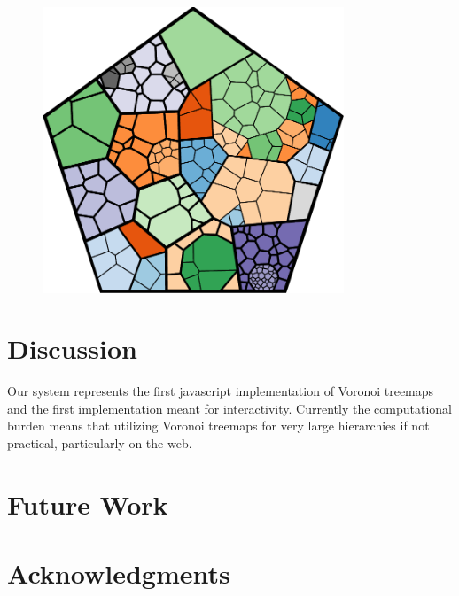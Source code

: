 \documentclass{acm_proc_article-sp} \usepackage{cite}
\begin{document}
\begin{figure}
\centering \includegraphics[width=90mm]{source-images/flare-color-pentagon-100.png}
\caption{}
\end{figure}


\section{Discussion}
\label{sec:discussion}
Our system represents the first javascript implementation of Voronoi
treemaps and the first implementation meant for
interactivity. Currently the computational burden means that utilizing
Voronoi treemaps for very large hierarchies if not practical,
particularly on the web.

\section{Future Work}
\label{sec:future}


\section{Acknowledgments}
\label{sec:acknowledgements}




{} 
\end{document}
